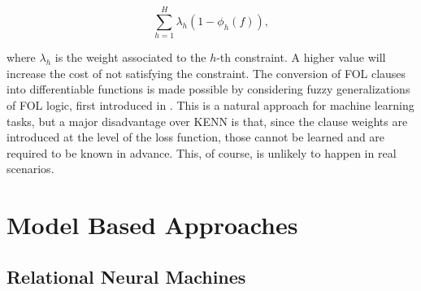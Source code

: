 $$ \sum_{h=1}^H \lambda_h(1 - \phi_h(f)), $$

where $\lambda_h$ is the weight associated to the $h$-th constraint. A higher value will increase the cost of not satisfying the constraint. The conversion of FOL clauses into differentiable functions is made possible by considering fuzzy generalizations of FOL logic, first introduced in \cite{novak1987first}. This is a natural approach for machine learning tasks, but a major disadvantage over KENN is that, since the clause weights are introduced at the level of the loss function, those cannot be learned and are required to be known in advance. This, of course, is unlikely to happen in real scenarios.

\section{Model Based Approaches}

\subsection{Relational Neural Machines}

